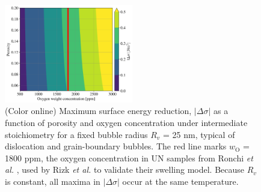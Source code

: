 \documentclass[preprint,12pt,sort&compress]{elsarticle}
\newcommand{\?}{\stackrel{?}{=}}
\begin{document}
\begin{figure}[h!]
    \centering
    \includegraphics[width=0.5\textwidth]{p_w_abs_gradual_plot_2_5e-08.png}
    \caption{(Color online) Maximum surface energy reduction, $|\Delta \sigma|$ as a function of porosity and oxygen concentration under intermediate stoichiometry for a fixed bubble radius $R_v$ = 25 nm, typical of dislocation and grain-boundary bubbles. The red line marks $w_\text{O}$ = 1800 ppm, the oxygen concentration in UN samples from Ronchi \textit{et al.} \cite{Ronchi1975,Ronchi1978}, used by Rizk \textit{et al.} \cite{Rizk2025} to validate their swelling model. Because $R_v$ is constant, all maxima in $|\Delta \sigma|$ occur at the same temperature.}
    \label{Fig:p_w_plot}
\end{figure}

\end{document}
